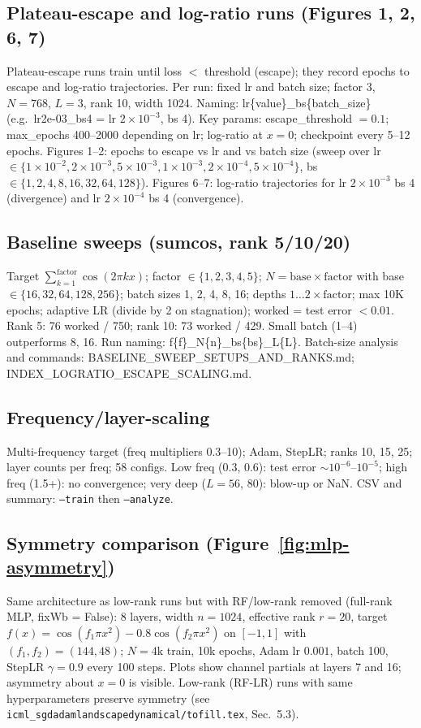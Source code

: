 \documentclass{article}
\begin{document}
\subsection{Plateau-escape and log-ratio runs (Figures 1, 2, 6, 7)}
Plateau-escape runs train until loss $<$ threshold (escape); they record epochs to escape and log-ratio trajectories. Per run: fixed lr and batch size; factor 3, $N=768$, $L=3$, rank 10, width 1024. Naming: lr\{value\}\_bs\{batch\_size\} (e.g.\ lr2e-03\_bs4 = lr $2{\times}10^{-3}$, bs 4). Key params: escape\_threshold $=0.1$; max\_epochs 400--2000 depending on lr; log-ratio at $x=0$; checkpoint every 5--12 epochs. Figures 1--2: epochs to escape vs lr and vs batch size (sweep over lr $\in \{1{\times}10^{-2}, 2{\times}10^{-3}, 5{\times}10^{-3}, 1{\times}10^{-3}, 2{\times}10^{-4}, 5{\times}10^{-4}\}$, bs $\in \{1,2,4,8,16,32,64,128\}$). Figures 6--7: log-ratio trajectories for lr $2{\times}10^{-3}$ bs 4 (divergence) and lr $2{\times}10^{-4}$ bs 4 (convergence).

\subsection{Baseline sweeps (sumcos, rank 5/10/20)}
Target $\sum_{k=1}^{\mathrm{factor}} \cos(2\pi k x)$; factor $\in \{1,2,3,4,5\}$; $N = \mathrm{base} \times \mathrm{factor}$ with base $\in \{16,32,64,128,256\}$; batch sizes 1, 2, 4, 8, 16; depths $1 \ldots 2{\times}\mathrm{factor}$; max 10K epochs; adaptive LR (divide by 2 on stagnation); worked = test error $< 0.01$. Rank 5: 76 worked / 750; rank 10: 73 worked / 429. Small batch (1--4) outperforms 8, 16. Run naming: f\{f\}\_N\{n\}\_bs\{bs\}\_L\{L\}. Batch-size analysis and commands: BASELINE\_SWEEP\_SETUPS\_AND\_RANKS.md; INDEX\_LOGRATIO\_ESCAPE\_SCALING.md.

\subsection{Frequency/layer-scaling}
Multi-frequency target (freq multipliers 0.3--10); Adam, StepLR; ranks 10, 15, 25; layer counts per freq; 58 configs. Low freq (0.3, 0.6): test error $\sim 10^{-6}$--$10^{-5}$; high freq (1.5+): no convergence; very deep ($L=56$, 80): blow-up or NaN. CSV and summary: \texttt{--train} then \texttt{--analyze}.

\subsection{Symmetry comparison (Figure~\ref{fig:mlp-asymmetry})}
Same architecture as low-rank runs but with RF/low-rank removed (full-rank MLP, fixWb = False): 8 layers, width $n=1024$, effective rank $r=20$, target $f(x)=\cos(f_1\pi x^2)-0.8\cos(f_2\pi x^2)$ on $[-1,1]$ with $(f_1,f_2)=(144,48)$; $N=4\mathrm{k}$ train, 10k epochs, Adam lr $0.001$, batch 100, StepLR $\gamma=0.9$ every 100 steps. Plots show channel partials at layers 7 and 16; asymmetry about $x=0$ is visible. Low-rank (RF-LR) runs with same hyperparameters preserve symmetry (see \texttt{icml\_sgdadamlandscapedynamical/tofill.tex}, Sec.~5.3).
\end{document}
